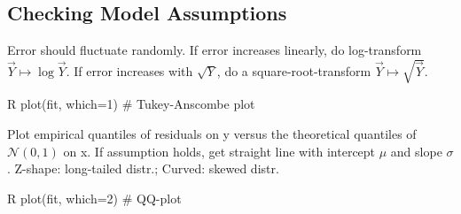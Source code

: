 \subsection{Checking Model Assumptions}\label{subsec:checking_model_assumptions}
\begin{sectionbox}\nospacing{}
  Error should fluctuate randomly. If error increases linearly, do log-transform $\vec{Y} \mapsto \log{\vec{Y}}$. If error increases with $\sqrt{Y}$, do a square-root-transform $\vec{Y} \mapsto \sqrt{\vec{Y}}$.
  \begin{mintlinebox}{R}
    plot(fit, which=1) # Tukey-Anscombe plot
  \end{mintlinebox}
\end{sectionbox}
\begin{sectionbox}\nospacing{}
  Plot empirical quantiles of residuals on y versus the theoretical quantiles of $\mathcal{N}(0,1)$ on x.
  If assumption holds, get straight line with intercept $\mu$ and slope $\sigma$.
  Z-shape: long-tailed distr.; Curved: skewed distr.
  \begin{mintlinebox}{R}
    plot(fit, which=2) # QQ-plot
  \end{mintlinebox}
\end{sectionbox}

